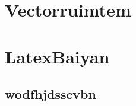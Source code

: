 \documentclass[11pt,a4paper,twoside,openright]{book}
\begin{document}
\chapter{Vectorruimtem}
\lipsum[1]

\chapter{LatexBaiyan}
\lipsum[1]
\section{wodfhjdsscvbn}
\lipsum[1]

\lipsum[1]

\lipsum[1]
\end{document}
